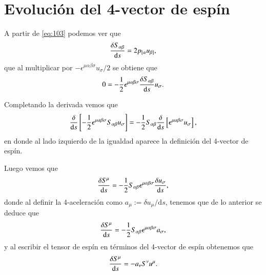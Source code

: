 \chapter{Evolución del 4-vector de espín}
\label{ape:ultimo}

A partir de \eqref{eq:103} podemos ver que
\begin{equation}
\frac{\delta S_{\alpha \beta}}{\mathrm{d}s} = 2 p_{[\alpha} u_{\beta]},
\end{equation}
que al multiplicar por $-\epsilon^{\mu \alpha \beta \sigma} u_{\sigma}/2$ se obtiene que
\begin{equation}
0 = - \frac{1}{2} \epsilon^{\mu \alpha \beta \sigma} \frac{\delta S_{\alpha \beta}}{\mathrm{d}s} u_{\sigma}.
\end{equation}

Completando la derivada vemos que
\begin{equation}
\frac{\delta }{\mathrm{d}s} \left[ - \frac{1}{2} \epsilon^{\mu \alpha \beta \sigma} S_{\alpha \beta} u_{\sigma} \right] = -\frac{1}{2} S_{\alpha \beta} \frac{\delta }{\mathrm{d}s} \left[ \epsilon^{\mu \alpha \beta \sigma} u_{\sigma} \right],
\end{equation}
en donde al lado izquierdo de la igualdad aparece la definición del 4-vector de espín. 

Luego vemos que
\begin{equation}
\frac{\delta S^{\mu}}{\mathrm{d}s} = - \frac{1}{2} S_{\alpha \beta} \epsilon^{\mu \alpha \beta \sigma} \frac{\delta u_{\sigma}}{\mathrm{d}s},
\end{equation}
donde al definir la 4-aceleración como $a_{\mu} := \delta u_{\mu} / \mathrm{d}s$, tenemos que de lo anterior se deduce que
\begin{equation}
\frac{\delta S^{\mu}}{\mathrm{d}s} = - \frac{1}{2} S_{\alpha \beta} \epsilon^{\mu \alpha \beta \sigma} a_{\sigma},
\end{equation}
y al escribir el tensor de espín en términos del 4-vector de espín obtenemos que
\begin{equation}
\frac{\delta S^{\mu}}{\mathrm{d}s} = - a_{\nu} S^{\nu} u^{\mu}.
\end{equation}